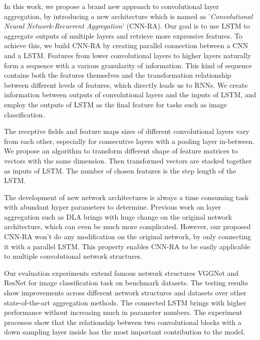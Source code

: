 \documentclass[runningheads]{llncs}
\begin{document}
In this work, we propose a brand new approach to convolutional layer aggregation, by introducing a new architecture which is named as '\emph{Convolutional Neural Network-Recurrent Aggregation}' (CNN-RA).  Our goal is to use LSTM to aggregate outputs of multiple layers and retrieve more expressive features. To achieve this, we build CNN-RA by creating parallel connection between a CNN and a LSTM. Features from lower convolutional layers to higher layers naturally form a sequence with a various granularity of information. This kind of sequence contains both the features themselves and the transformation relationship between different levels of features, which directly leads us to RNNs. We create information between outputs of convolutional layers and the inputs of LSTM, and employ the outputs of LSTM as the final feature for tasks such as image classification.

The receptive fields and feature maps sizes of different convolutional layers vary from each other, especially for consecutive layers with a pooling layer in-between. We propose an algorithm to transform different shape of feature matrices to vectors with the same dimension. Then transformed vectors are stacked together as inputs of LSTM. The number of chosen features is the step length of the LSTM.

The development of new network architectures is always a time consuming task with abundant hyper parameters to determine. Previous work on layer aggregation such as DLA\cite{dla} brings with huge change on the original network architecture, which can even be much more complicated. However, our proposed CNN-RA won't do any modification on the original network, by only connecting it with a parallel LSTM. This property enables CNN-RA to be easily applicable to multiple convolutional network structures. 

Our evaluation experiments extend famous network structures VGGNet\cite{vgg} and ResNet\cite{resnet} for image classification task on benchmark datasets. The testing results show improvements across different network structures and datasets over other state-of-the-art aggregation methods. The connected LSTM brings with higher performance without increasing much in parameter numbers. The experiment processes show that the relationship between two convolutional blocks with a down sampling layer inside has the most important contribution to the model.


\end{document}

